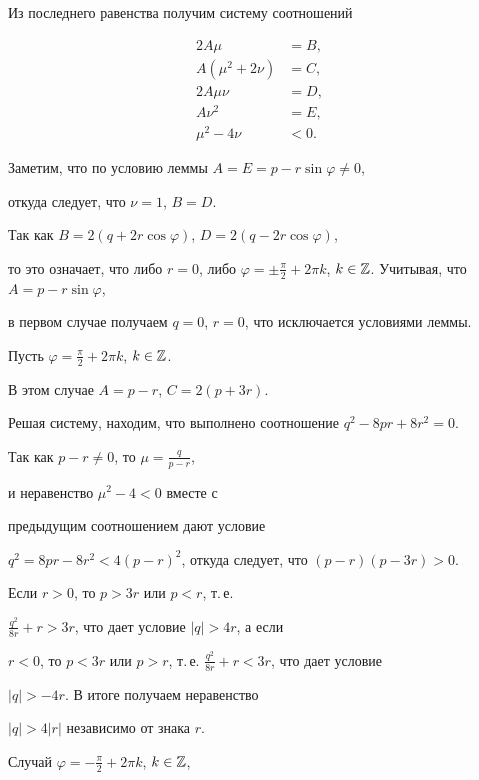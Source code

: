 Из последнего равенства получим систему соотношений


\begin{align*}


2A\mu &= B, \\


A(\mu ^2+2\nu) &= C, \\


2A\mu \nu &= D, \\


A \nu ^2 &= E, \\


\mu ^2 - 4\nu & <  0.


\end{align*}





Заметим, что по условию леммы $A=E=p - r\sin \varphi \ne 0$,


откуда следует, что $\nu=1$, $B=D$.


Так как $B=2(q+2r\cos \varphi)$, $D=2(q - 2r\cos \varphi)$,


то это означает, что либо $r=0$, либо $\varphi=\pm \frac{\pi}


{2}+2\pi k$, $k \in\Bbb Z$. Учитывая, что $A=p - r\sin \varphi$,


в первом случае получаем $q=0$, $r=0$, что исключается условиями леммы.


Пусть $\varphi=\frac{\pi} {2}+2\pi k$, $k \in\Bbb Z$.


В этом случае $A=p - r$, $C=2(p+3r)$.


Решая систему, находим, что выполнено соотношение $q^2 - 8pr+8r^2=0$.


Так как $p - r \ne 0$, то $\mu=\frac{q}{{p - r}}$,


и неравенство $\mu ^2 - 4 < 0$ вместе с


предыдущим соотношением дают условие


$q^2=8pr - 8r^2 < 4(p-r)^2$, откуда следует, что $(p-r)(p-3r)>0$.


Если $r>0$, то $p>3r$ или $p<r$, т.\,е.


$\frac{q^2}{8r}+r >3r$, что дает условие $| q |>4r$, а если


$r<0$, то $p<3r$ или $p>r$, т.\,е. $\frac{q^2}{8r}+r <3r$, что дает условие


$|q| > -4r$. В итоге получаем неравенство


$|q| > 4 |r|$ независимо от знака $r$.


Случай $\varphi=- \frac{\pi}{2}+2\pi k$, $k \in\Bbb Z$,


